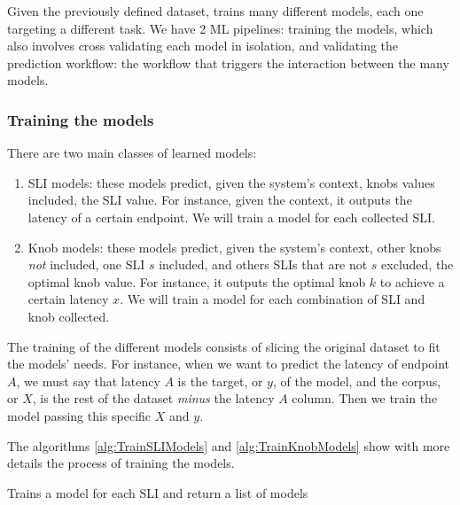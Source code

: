 Given the previously defined dataset, \projectname{} trains many different models, each one targeting a different task. We have 2 ML pipelines: training the models, which also involves cross validating each model in isolation, and validating the prediction workflow: the workflow that triggers the interaction between the many models.

\subsubsection{Training the models}

There are two main classes of learned models:

\begin{enumerate}
  \item SLI models: these models predict, given the system's context, knobs values included, the SLI value. For instance, given the context, it outputs the latency of a certain endpoint. We will train a model for each collected SLI.
  \item Knob models: these models predict, given the system's context, other knobs \textit{not} included, one SLI $s$ included, and others SLIs that are not $s$ excluded, the optimal knob value. For instance, it outputs the optimal knob $k$ to achieve a certain latency $x$. We will train a model for each combination of SLI and knob collected.
\end{enumerate}

The training of the different models consists of slicing the original dataset to fit the models' needs. For instance, when we want to predict the latency of endpoint $A$, we must say that latency $A$ is the target, or $y$, of the model, and the corpus, or $X$, is the rest of the dataset \textit{minus} the latency $A$ column. Then we train the model passing this specific $X$ and $y$.

The algorithms \ref{alg:TrainSLIModels} and \ref{alg:TrainKnobModels} show with more details the process of training the models.
\SetInd{0.75em}{0.1em}
\begin{algorithm}
  \SetAlgoNoLine
  \caption{Trains a model for each SLI and return a list of models}\label{alg:TrainSLIModels}

\end{algorithm}


